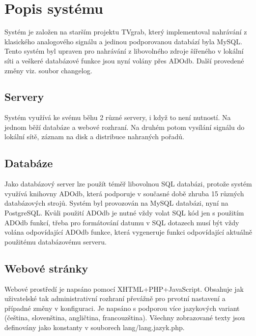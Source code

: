 \chapter{Popis systému}

Systém je založen na starším projektu TVgrab, který implementoval nahrávání z klasického analogového signálu a jedinou podporovanou databází byla MySQL. Tento systém byl upraven pro nahrávání z libovolného zdroje šířeného v lokální síti a veškeré databázové funkce jsou nyní volány přes ADOdb. Další provedené změny viz. soubor changelog.

\vspace{10pt}

\section{Servery}
Systém využívá ke svému běhu 2 různé servery, i když to není nutností. Na jednom běží databáze a webové rozhraní. Na druhém potom vysílání signálu do lokální sítě, záznam na disk a distribuce nahraných pořadů.

\vspace{10pt}

\section{Databáze}

\vspace{10pt}

Jako databázový server lze použít téměř libovolnou SQL databázi, protože systém využívá knihovny ADOdb, která podporuje v současné době zhruba 15 různých databázových strojů. Systém byl provozován na MySQL databázi, nyní na PostgreSQL. Kvůli použití ADOdb je nutné vždy volat SQL kód jen s použitím ADOdb funkcí, třeba pro formátování datumu v SQL dotazech musí být vždy volána odpovídající ADOdb funkce, která vygeneruje funkci odpovídající aktuálně použitému databázovému serveru.

\vspace{10pt}

\section{Webové stránky}

\vspace{10pt}

Webové prostředí je napsáno pomocí XHTML+PHP+JavaScript. Obsahuje jak uživatelské tak administrativní rozhraní převážně pro prvotní nastavení a případné změny v konfiguraci. Je napsáno s podporou více jazykových variant (čeština, slovenština, angličtina, francouzština). Všechny zobrazované texty jsou definovány jako konstanty v souborech lang/lang.jazyk.php.

